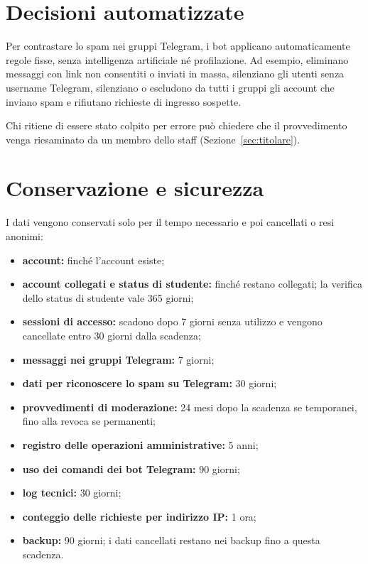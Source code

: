 \documentclass[legal]{polinetwork}
\begin{document}
\section{Decisioni automatizzate}
\label{sec:decisioni-automatizzate}

Per contrastare lo spam nei gruppi Telegram, i bot applicano automaticamente regole fisse, senza intelligenza artificiale né profilazione. Ad esempio, eliminano messaggi con link non consentiti o inviati in massa, silenziano gli utenti senza username Telegram, silenziano o escludono da tutti i gruppi gli account che inviano spam e rifiutano richieste di ingresso sospette.

Chi ritiene di essere stato colpito per errore può chiedere che il provvedimento venga riesaminato da un membro dello staff (Sezione~\ref{sec:titolare}).

\section{Conservazione e sicurezza}
\label{sec:conservazione}

I dati vengono conservati solo per il tempo necessario e poi cancellati o resi anonimi:
\begin{itemize}
    \item \textbf{account:} finché l'account esiste;
    \item \textbf{account collegati e status di studente:} finché restano collegati; la verifica dello status di studente vale 365 giorni;
    \item \textbf{sessioni di accesso:} scadono dopo 7 giorni senza utilizzo e vengono cancellate entro 30 giorni dalla scadenza;
    \item \textbf{messaggi nei gruppi Telegram:} 7 giorni;
    \item \textbf{dati per riconoscere lo spam su Telegram:} 30 giorni;
    \item \textbf{provvedimenti di moderazione:} 24 mesi dopo la scadenza se temporanei, fino alla revoca se permanenti;
    \item \textbf{registro delle operazioni amministrative:} 5 anni;
    \item \textbf{uso dei comandi dei bot Telegram:} 90 giorni;
    \item \textbf{log tecnici:} 30 giorni;
    \item \textbf{conteggio delle richieste per indirizzo IP:} 1 ora;
    \item \textbf{backup:} 90 giorni; i dati cancellati restano nei backup fino a questa scadenza.
\end{itemize}
\end{document}
